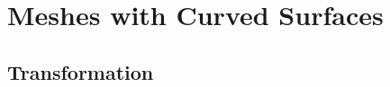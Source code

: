 \documentclass[12pt]{article}
\begin{document}
\section{Meshes with Curved Surfaces}

\subsection{Transformation}

%
%
\end{document}
